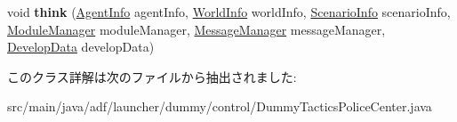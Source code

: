 \begin{DoxyCompactItemize}
\item 
\hypertarget{classadf_1_1launcher_1_1dummy_1_1control_1_1DummyTacticsPoliceCenter_a5e22ececd97960eee50e96c20fc47038}{}\label{classadf_1_1launcher_1_1dummy_1_1control_1_1DummyTacticsPoliceCenter_a5e22ececd97960eee50e96c20fc47038} 
void {\bfseries think} (\hyperlink{classadf_1_1agent_1_1info_1_1AgentInfo}{Agent\+Info} agent\+Info, \hyperlink{classadf_1_1agent_1_1info_1_1WorldInfo}{World\+Info} world\+Info, \hyperlink{classadf_1_1agent_1_1info_1_1ScenarioInfo}{Scenario\+Info} scenario\+Info, \hyperlink{classadf_1_1agent_1_1module_1_1ModuleManager}{Module\+Manager} module\+Manager, \hyperlink{classadf_1_1agent_1_1communication_1_1MessageManager}{Message\+Manager} message\+Manager, \hyperlink{classadf_1_1agent_1_1develop_1_1DevelopData}{Develop\+Data} develop\+Data)
\end{DoxyCompactItemize}


このクラス詳解は次のファイルから抽出されました\+:\begin{DoxyCompactItemize}
\item 
src/main/java/adf/launcher/dummy/control/Dummy\+Tactics\+Police\+Center.\+java\end{DoxyCompactItemize}

